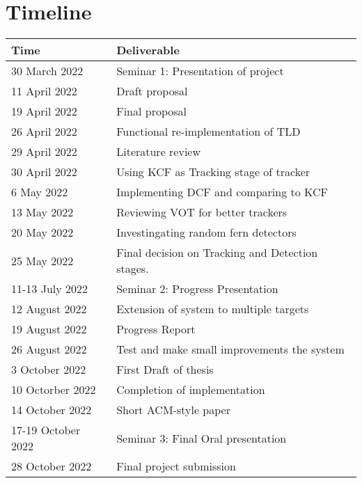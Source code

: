 \section{Timeline}
\begin{center}
  \begin{tabular}{l l}
    \toprule
      Time & Deliverable\\
    \midrule
      30 March 2022     & Seminar 1: Presentation of project\\
      11 April 2022     & Draft proposal\\
      19 April 2022     & Final proposal\\
      26 April 2022     & Functional re-implementation of TLD\\
      29 April 2022     & Literature review\\
      30 April 2022     & Using KCF as Tracking stage of tracker\\
      6 May 2022        & Implementing DCF and comparing to KCF\\
      13 May 2022       & Reviewing VOT for better trackers\\
      20 May 2022       & Investingating random fern detectors\\
      25 May 2022       & Final decision on Tracking and Detection stages.\\
      11-13 July 2022   & Seminar 2: Progress Presentation\\
      12 August 2022    & Extension of system to multiple targets\\
      19 August 2022    & Progress Report\\
      26 August 2022    & Test and make small improvements the system\\
      3 October 2022    & First Draft of thesis\\
      10 Octorber 2022  & Completion of implementation\\
      14 October 2022   & Short ACM-style paper\\
      17-19 October 2022& Seminar 3: Final Oral presentation\\
      28 October 2022   & Final project submission\\
    \bottomrule
  \end{tabular}
\end{center}
